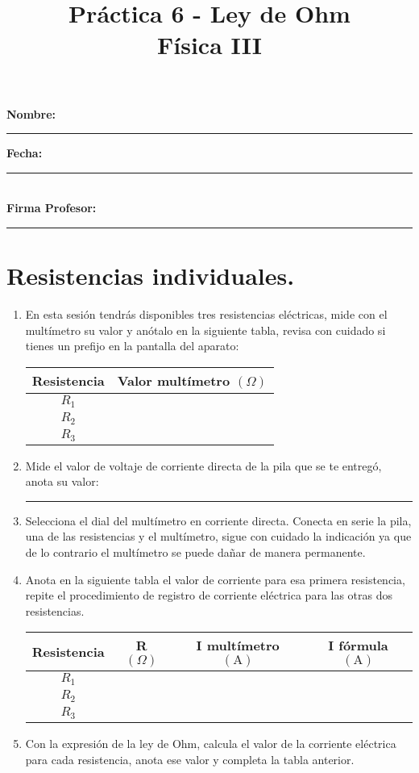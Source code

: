 \documentclass[14pt]{extarticle}
\title{\vspace*{-2cm} Práctica 6 - Ley de Ohm\\  Física III \vspace{-5ex}}
\date{}
\begin{document}
\maketitle

\noindent
\textbf{Nombre:} \rule{8cm}{0.1mm} \textbf{Fecha:} \rule{3cm}{0.1mm} \\[0.5em]
\textbf{Firma Profesor:} \rule{4cm}{0.1mm}

\section{Resistencias individuales.}

\begin{enumerate}
\item En esta sesión tendrás disponibles tres resistencias eléctricas, mide con el multímetro su valor y anótalo en la siguiente tabla, revisa con cuidado si tienes un prefijo en la pantalla del aparato:
\begin{table}[H]
\centering
\begin{tabular}{| c | c |} \hline
Resistencia & Valor multímetro $(\Omega)$ \\ \hline
$R_{1}$ & \\ \hline
$R_{2}$ & \\ \hline
$R_{3}$ & \\ \hline
\end{tabular}
\end{table}
\item Mide el valor de voltaje de corriente directa de la pila que se te entregó, anota su valor: \rule{2cm}{0.1mm}
\item Selecciona el dial del multímetro en corriente directa. Conecta en serie la pila, una de las resistencias y el multímetro, sigue con cuidado la indicación ya que de lo contrario el multímetro se puede dañar de manera permanente.
\item Anota en la siguiente tabla el valor de corriente para esa primera resistencia, repite el procedimiento de registro de corriente eléctrica para las otras dos resistencias.
\begin{table}[H]
\centering
\begin{tabular}{| c | c | c | c |} \hline
Resistencia & R $(\Omega)$ & I multímetro $(\si{\ampere})$ & I fórmula $(\si{\ampere}) $\\ \hline
$R_{1}$ & & & \\ \hline
$R_{2}$ & & & \\ \hline
$R_{3}$ & & & \\ \hline
\end{tabular}
\end{table}
\item Con la expresión de la ley de Ohm, calcula el valor de la corriente eléctrica para cada resistencia, anota ese valor y completa la tabla anterior.
\end{enumerate}
\end{document}
